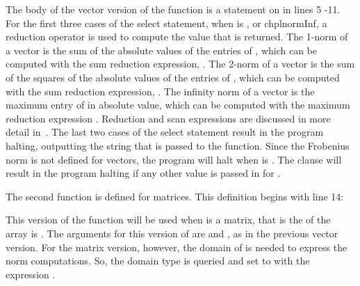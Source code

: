 The body of the vector version of the  function is a  statement on
 in lines 5 -11.  For the first three cases of the select statement,
when  is ,  or chpl{normInf},
a reduction operator is used to compute the value that is returned. 
The 1-norm of a vector is the sum of the absolute values of the entries of ,
which can be computed with the sum reduction expression, .
The 2-norm of a vector is the sum of the squares of the absolute values of
the entries of , which can be computed with the sum reduction expression,
.
The infinity norm of a vector is the maximum entry of  in absolute value,
which can be computed with the maximum reduction expression .
Reduction and scan expressions are discussed in more detail 
in~.  The last two cases of the select statement result
in the program halting, outputting the string that is passed to the 
function.  Since the Frobenius norm is not defined for vectors, the program
will halt when  is .  The  clause will
result in the program halting if any other value is passed in for .

The second  function is defined for matrices.  This definition begins
with line 14:
\begin{chapel}
  def norm(x:[?D], p: normType) where x.rank == 2 {
\end{chapel}
This version of the function will be used when  is a matrix,
that is the  of the array  is .  The arguments
for this version of  are  and , as in the previous
vector version.  For the matrix version, however, the domain of  is
needed to express the  norm computations.  So, the domain type is queried and set to 
 with the expression \chpl{[?D]}.  

